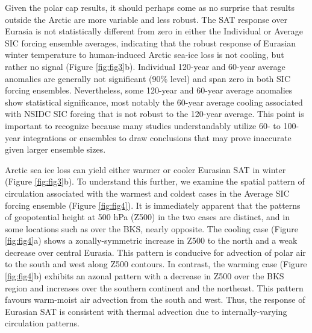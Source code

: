 \documentclass{nature}
\begin{document}
Given the polar cap results, it should perhaps come as no surprise that results outside the Arctic are more variable and less robust. The SAT response over Eurasia is not statistically different from zero in either the Individual or Average SIC forcing ensemble averages, indicating that the robust response of Eurasian winter temperature to human-induced Arctic sea-ice loss is not cooling, but rather no signal (Figure \ref{fig:fig3}b). Individual 120-year and 60-year average anomalies are generally not significant (90\% level) and span zero in both SIC forcing ensembles. Nevertheless, some 120-year and 60-year average anomalies show statistical significance, most notably the 60-year average cooling associated with NSIDC SIC forcing that is not robust to the 120-year average. This point is important to recognize because many studies understandably utilize 60- to 100-year integrations or ensembles to draw conclusions that may prove inaccurate given larger ensemble sizes.%

Arctic sea ice loss can yield either warmer or cooler Eurasian SAT in winter (Figure \ref{fig:fig3}b). To understand this further, we examine the spatial pattern of circulation associated with the warmest and coldest cases in the Average SIC forcing ensemble (Figure \ref{fig:fig4}). It is immediately apparent that the patterns of geopotential height at 500 hPa (Z500) in the two cases are distinct, and in some locations such as over the BKS, nearly opposite. The cooling case (Figure \ref{fig:fig4}a) shows a zonally-symmetric increase in Z500 to the north and a weak decrease over central Eurasia. This pattern is conducive for advection of polar air to the south and west along Z500 contours. In contrast, the warming case (Figure \ref{fig:fig4}b) exhibits an azonal pattern with a decrease in Z500 over the BKS region and increases over the southern continent and the northeast. This pattern favours warm-moist air advection from the south and west. Thus, the response of Eurasian SAT is consistent with thermal advection due to internally-varying circulation patterns. %
\end{document}
